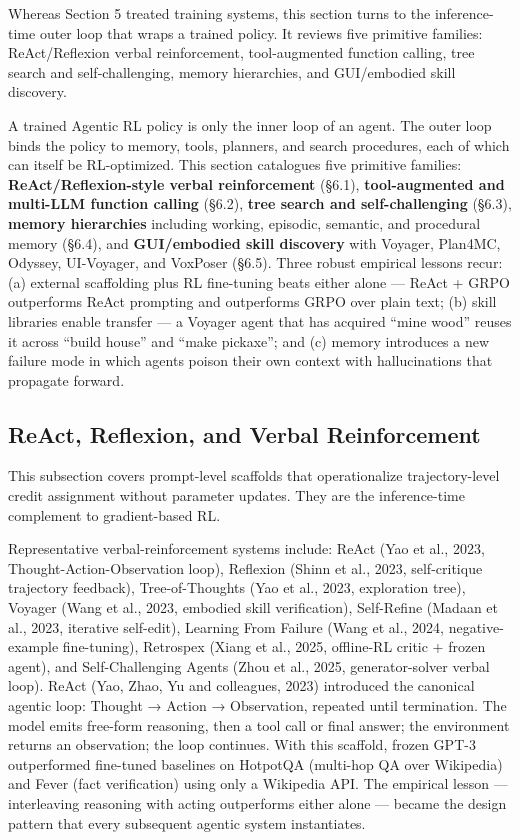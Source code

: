 Whereas Section 5 treated training systems, this section turns to the inference-time outer loop that wraps a trained policy. It reviews five primitive families: ReAct/Reflexion verbal reinforcement, tool-augmented function calling, tree search and self-challenging, memory hierarchies, and GUI/embodied skill discovery.

A trained Agentic RL policy is only the inner loop of an agent. The outer loop binds the policy to memory, tools, planners, and search procedures, each of which can itself be RL-optimized. This section catalogues five primitive families: \textbf{ReAct/Reflexion-style verbal reinforcement} (§6.1), \textbf{tool-augmented and multi-LLM function calling} (§6.2), \textbf{tree search and self-challenging} (§6.3), \textbf{memory hierarchies} including working, episodic, semantic, and procedural memory (§6.4), and \textbf{GUI/embodied skill discovery} with Voyager, Plan4MC, Odyssey, UI-Voyager, and VoxPoser (§6.5). Three robust empirical lessons recur: (a) external scaffolding plus RL fine-tuning beats either alone --- ReAct + GRPO outperforms ReAct prompting and outperforms GRPO over plain text; (b) skill libraries enable transfer --- a Voyager agent that has acquired ``mine wood'' reuses it across ``build house'' and ``make pickaxe''; and (c) memory introduces a new failure mode in which agents poison their own context with hallucinations that propagate forward.

\subsection{ReAct, Reflexion, and Verbal Reinforcement}\label{react-reflexion-and-verbal-reinforcement}

This subsection covers prompt-level scaffolds that operationalize trajectory-level credit assignment without parameter updates. They are the inference-time complement to gradient-based RL.

Representative verbal-reinforcement systems include: ReAct (Yao et al., 2023, Thought-Action-Observation loop), Reflexion (Shinn et al., 2023, self-critique trajectory feedback), Tree-of-Thoughts (Yao et al., 2023, exploration tree), Voyager (Wang et al., 2023, embodied skill verification), Self-Refine (Madaan et al., 2023, iterative self-edit), Learning From Failure (Wang et al., 2024, negative-example fine-tuning), Retrospex (Xiang et al., 2025, offline-RL critic + frozen agent), and Self-Challenging Agents (Zhou et al., 2025, generator-solver verbal loop). ReAct (Yao, Zhao, Yu and colleagues, 2023) introduced the canonical agentic loop: Thought → Action → Observation, repeated until termination. The model emits free-form reasoning, then a tool call or final answer; the environment returns an observation; the loop continues. With this scaffold, frozen GPT-3 outperformed fine-tuned baselines on HotpotQA (multi-hop QA over Wikipedia) and Fever (fact verification) using only a Wikipedia API. The empirical lesson --- interleaving reasoning with acting outperforms either alone --- became the design pattern that every subsequent agentic system instantiates.

